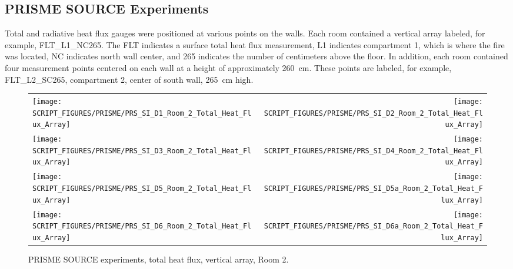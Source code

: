 \clearpage


\subsection{PRISME SOURCE Experiments}

Total and radiative heat flux gauges were positioned at various points on the walls. Each room contained a vertical array labeled, for example, FLT\_L1\_NC265. The FLT indicates a surface total heat flux measurement, L1 indicates compartment 1, which is where the fire was located, NC indicates north wall center, and 265 indicates the number of centimeters above the floor. In addition, each room contained four measurement points centered on each wall at a height of approximately 260~cm. These points are labeled, for example, FLT\_L2\_SC265, compartment 2, center of south wall, 265~cm high.

\newpage

\begin{figure}[p]
\begin{tabular*}{\textwidth}{l@{\extracolsep{\fill}}r}
\texttt{[image: SCRIPT\_FIGURES/PRISME/PRS\_SI\_D1\_Room\_2\_Total\_Heat\_Flux\_Array]} &
\texttt{[image: SCRIPT\_FIGURES/PRISME/PRS\_SI\_D2\_Room\_2\_Total\_Heat\_Flux\_Array]} \\
\texttt{[image: SCRIPT\_FIGURES/PRISME/PRS\_SI\_D3\_Room\_2\_Total\_Heat\_Flux\_Array]} &
\texttt{[image: SCRIPT\_FIGURES/PRISME/PRS\_SI\_D4\_Room\_2\_Total\_Heat\_Flux\_Array]} \\
\texttt{[image: SCRIPT\_FIGURES/PRISME/PRS\_SI\_D5\_Room\_2\_Total\_Heat\_Flux\_Array]} &
\texttt{[image: SCRIPT\_FIGURES/PRISME/PRS\_SI\_D5a\_Room\_2\_Total\_Heat\_Flux\_Array]} \\
\texttt{[image: SCRIPT\_FIGURES/PRISME/PRS\_SI\_D6\_Room\_2\_Total\_Heat\_Flux\_Array]} &
\texttt{[image: SCRIPT\_FIGURES/PRISME/PRS\_SI\_D6a\_Room\_2\_Total\_Heat\_Flux\_Array]}
\end{tabular*}
\caption[PRISME SOURCE experiments, total heat flux, vertical array, Room 2]{PRISME SOURCE experiments, total heat flux, vertical array, Room 2.}
\label{PRISME_SOURCE_Wall_Array_THF_Room_2}
\end{figure}

